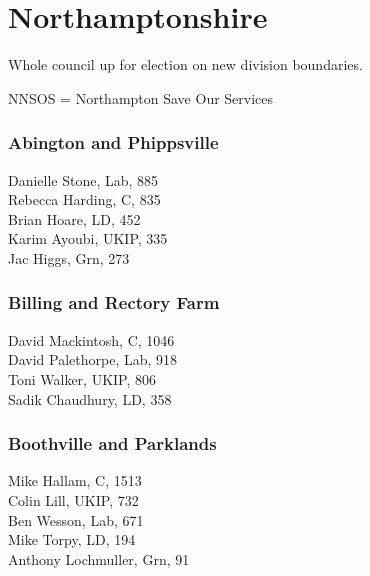 \documentclass[a4paper,openany,10pt]{book}
\begin{document}
\vfill

\section{Northamptonshire}

Whole council up for election on new division boundaries.

NNSOS = Northampton Save Our Services



\subsubsection*{Abington and Phippsville}



Danielle Stone, Lab, 885\\
Rebecca Harding, C, 835\\
Brian Hoare, LD, 452\\
Karim Ayoubi, UKIP, 335\\
Jac Higgs, Grn, 273\\


\subsubsection*{Billing and Rectory Farm}



David Mackintosh, C, 1046\\
David Palethorpe, Lab, 918\\
Toni Walker, UKIP, 806\\
Sadik Chaudhury, LD, 358\\


\subsubsection*{Boothville and Parklands}



Mike Hallam, C, 1513\\
Colin Lill, UKIP, 732\\
Ben Wesson, Lab, 671\\
Mike Torpy, LD, 194\\
Anthony Lochmuller, Grn, 91\\
\end{document}
